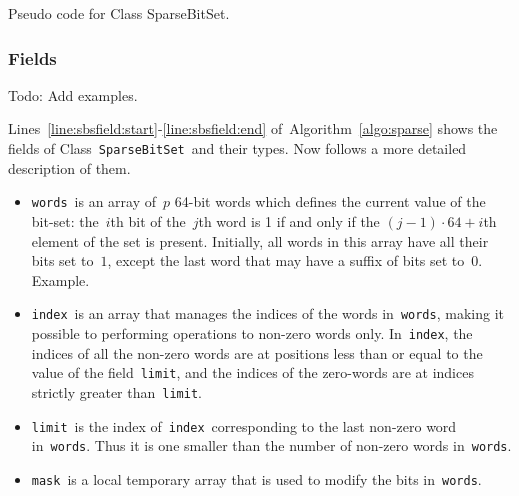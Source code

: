 \documentclass[a4paper,11pt]{article}
\newcommand{\Todo}[1]{{\color{blue}#1}}
\newcommand{\Algoref}[1]{Algorithm~\ref{#1}}
\newcommand{\Linesref}[2]{Lines~\ref{#1}-\ref{#2}}
\newcommand{\Words}{\texttt{words}}
\newcommand{\Index}{\texttt{index}}
\newcommand{\Mask}{\texttt{mask}}
\newcommand{\Limit}{\texttt{limit}}
\newcommand{\SparseBitSet}{\texttt{SparseBitSet}}
\numberwithin{equation}{section}
\begin{document}
\begin{algorithm}[H]
  \begin{algorithmic}[1]  %
    
    \end{algorithmic}
  \caption{Pseudo code for Class SparseBitSet.}
  \label{algo:sparse}
\end{algorithm}

\subsubsection{Fields}
\label{sbs:fields}

\Todo{Todo: Add examples.}

\Linesref{line:sbsfield:start}{line:sbsfield:end} of~\Algoref{algo:sparse} shows the fields
of Class~\SparseBitSet~and their types. Now follows a more detailed description of them.

\begin{itemize}
  \item \Words~is an array of~$p$ 64-bit words which defines the current value of the bit-set:
    the~$i$th bit of the~$j$th word is 1 if and only if the $(j-1) \cdot 64 + i$th element of
    the set is present. Initially, all words in this array have all their bits set to~$1$,
    except the last word that may have a suffix of bits set to~$0$. \Todo{Example.}

  \item \Index~is an array that manages the indices of the words in~\Words,
    making it possible to performing operations to non-zero words only.
    In~\Index, the
    indices of all the non-zero words are at positions less than or
    equal to the value of the field~\Limit, and the indices of the zero-words are
    at indices strictly greater than~\Limit. 

  \item \Limit~is the index of~\Index~corresponding to the last non-zero word in~\Words.
    Thus it is one smaller than the number of non-zero words in~\Words.

  \item \Mask~is a local temporary array that is used to modify the bits in~\Words.
    
\end{itemize}
\end{document}
